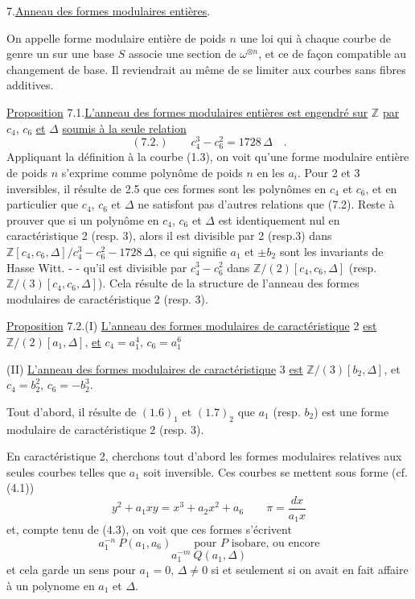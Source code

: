 7.\quad\uline{Anneau des formes modulaires entières}.

On appelle forme modulaire entière de poids $n$ une loi qui à chaque courbe de genre un sur une base $S$ associe une section de $\omega^{\otimes n}$, et ce de façon compatible au changement de base. Il reviendrait au même de se limiter aux courbes sans fibres additives.

\uline{Proposition} 7.1.\quad\uline{L'anneau des formes modulaires entières est engendré sur} $\mathbb Z$ \uline{par} $c_4$, $c_6$ \uline{et} $\Delta$ \uline{soumis à la seule relation}
\[
(7.2.)\qquad c_4^3-c_6^2=1728\,\Delta\quad.
\]
Appliquant la définition à la courbe (1.3), on voit qu'une forme modulaire entière de poids $n$ s'exprime comme polynôme de poids $n$ en les $a_i$. Pour 2 et 3 inversibles, il résulte de 2.5 que ces formes sont les polynômes en $c_4$ et $c_6$, et en particulier que $c_4$, $c_6$ et $\Delta$ ne satisfont pas d'autres relations que (7.2). Reste à prouver que si un polynôme en $c_4$, $c_6$ et $\Delta$ est identiquement nul en caractéristique 2 (resp. 3), alors il est divisible par 2 (resp.3) dans $\mathbb Z[c_4,c_6,\Delta]/c_4^3-c_6^2-1728\,\Delta$, ce qui signifie
$a_1$ et $\pm b_2$ sont les invariants de Hasse Witt.
-  -
qu'il est divisible par $c_4^3-c_6^2$ dans $\mathbb Z/(2)[c_4,c_6,\Delta]$ (resp. $\mathbb Z/(3)[c_4,c_6,\Delta]$). Cela résulte de la structure de l'anneau des formes modulaires de caractéristique 2 (resp. 3).

\uline{Proposition} 7.2.\quad(I) \uline{L'anneau des formes modulaires de caractéristique} 2 \uline{est} $\mathbb Z/(2)[a_1,\Delta]$, \uline{et} $c_4=a_1^4$, $c_6=a_1^6$

(II) \uline{L'anneau des formes modulaires de caractéristique} 3 \uline{est} $\mathbb Z/(3)[b_2,\Delta]$, et $c_4=b_2^2$, $c_6=-b_2^3$.

Tout d'abord, il résulte de $(1.6)_1$ et $(1.7)_2$ que $a_1$ (resp. $b_2$) est une forme modulaire de caractéristique 2 (resp. 3).

En caractéristique 2, cherchons tout d'abord les formes modulaires relatives aux seules courbes telles que $a_1$ soit inversible. Ces courbes se mettent sous forme (cf. (4.1))
\[
y^2+a_1xy=x^3+a_2x^2+a_6\qquad\pi=\frac{dx}{a_1x}
\]
et, compte tenu de (4.3), on voit que ces formes s'écrivent
\[
a_1^{-n}\ P(a_1,a_6)\qquad\text{pour }P\text{ isobare, ou encore}
\]
\[
a_1^{-m}\ Q(a_1,\Delta)
\]
et cela garde un sens pour $a_1=0$, $\Delta\ne0$ si et seulement si on avait en fait affaire à un polynome en $a_1$ et $\Delta$.

